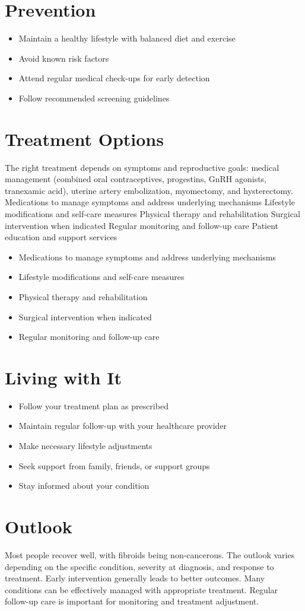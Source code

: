 \section{Prevention}
\begin{itemize}[noitemsep]
  \item Maintain a healthy lifestyle with balanced diet and exercise
  \item Avoid known risk factors
  \item Attend regular medical check-ups for early detection
  \item Follow recommended screening guidelines
\end{itemize}
\section{Treatment Options}
The right treatment depends on symptoms and reproductive goals: medical management (combined oral contraceptives, progestins, GnRH agonists, tranexamic acid), uterine artery embolization, myomectomy, and hysterectomy. Medications to manage symptoms and address underlying mechanisms Lifestyle modifications and self-care measures Physical therapy and rehabilitation Surgical intervention when indicated Regular monitoring and follow-up care Patient education and support services

\begin{itemize}[noitemsep]
  \item Medications to manage symptoms and address underlying mechanisms
  \item Lifestyle modifications and self-care measures
  \item Physical therapy and rehabilitation
  \item Surgical intervention when indicated
  \item Regular monitoring and follow-up care
\end{itemize}
\section{Living with It}
\begin{itemize}[noitemsep]
  \item Follow your treatment plan as prescribed
  \item Maintain regular follow-up with your healthcare provider
  \item Make necessary lifestyle adjustments
  \item Seek support from family, friends, or support groups
  \item Stay informed about your condition
\end{itemize}
\section{Outlook}
Most people recover well, with fibroids being non-cancerous. The outlook varies depending on the specific condition, severity at diagnosis, and response to treatment. Early intervention generally leads to better outcomes. Many conditions can be effectively managed with appropriate treatment. Regular follow-up care is important for monitoring and treatment adjustment.

